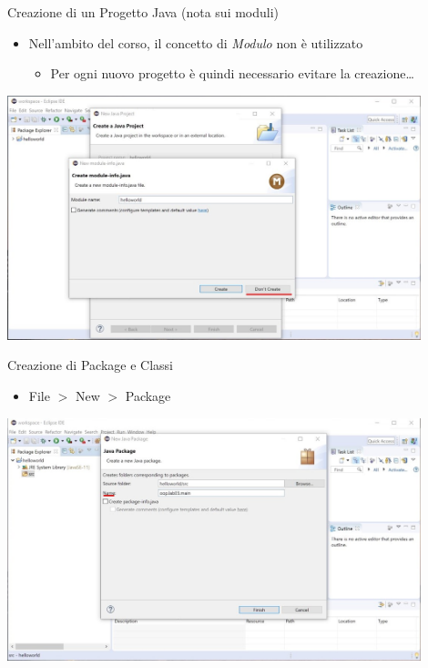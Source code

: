 \documentclass[presentation]{beamer}
\begin{document}
\begin{frame}{Creazione di un Progetto Java (nota sui moduli)}
\begin{itemize}
\item Nell'ambito del corso, il concetto di \emph{Modulo} non è utilizzato
\begin{itemize}
\item Per ogni nuovo progetto è quindi necessario evitare la creazione\dots
\end{itemize}
\end{itemize}
\begin{center}
\includegraphics[width=0.9\textwidth]{img/eclipse-screenshots/eclipse-ide-02b.jpg}
\end{center}
\end{frame}

\begin{frame}{Creazione di Package e Classi}
\begin{itemize}
\item File $>$ New $>$ Package
\end{itemize}
\begin{center}
\includegraphics[width=0.9\textwidth]{img/eclipse-screenshots/eclipse-ide-02c.jpg}
\end{center}
\end{frame}
\end{document}
